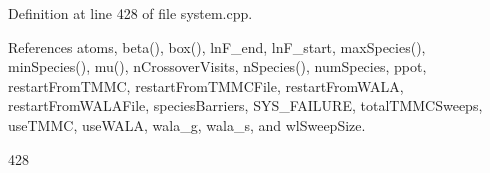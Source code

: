 Definition at line 428 of file system.\-cpp.



References atoms, beta(), box(), ln\-F\-\_\-end, ln\-F\-\_\-start, max\-Species(), min\-Species(), mu(), n\-Crossover\-Visits, n\-Species(), num\-Species, ppot, restart\-From\-T\-M\-M\-C, restart\-From\-T\-M\-M\-C\-File, restart\-From\-W\-A\-L\-A, restart\-From\-W\-A\-L\-A\-File, species\-Barriers, S\-Y\-S\-\_\-\-F\-A\-I\-L\-U\-R\-E, total\-T\-M\-M\-C\-Sweeps, use\-T\-M\-M\-C, use\-W\-A\-L\-A, wala\-\_\-g, wala\-\_\-s, and wl\-Sweep\-Size.


\begin{DoxyCode}
428                                                                                                            
                                                                                                                  

\end{DoxyCode}
